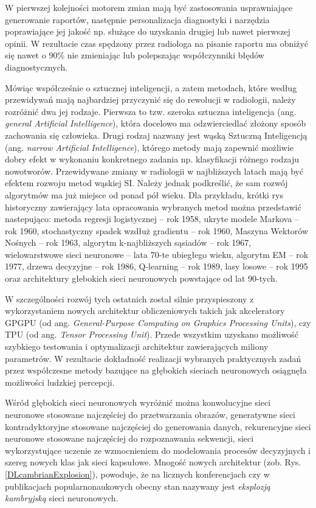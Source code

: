 W pierwszej kolejności motorem zmian mają być zastosowania usprawniające generowanie raportów, następnie personalizacja diagnostyki i narzędzia poprawiające jej jakość np. służące do uzyskania drugiej lub nawet pierwszej opinii. W rezultacie czas spędzony przez radiologa na pisanie raportu ma obniżyć się nawet o 90\% nie zmieniając lub polepszając współczynniki błędów diagnostycznych.

Mówiąc współcześnie o sztucznej inteligencji, a zatem metodach, które według przewidywań mają najbardziej przyczynić się do rewolucji w radiologii, należy rozróżnić dwa jej rodzaje. Pierwsza to tzw. szeroka sztuczna inteligencja (ang. \textit{general Artificial Intelligence}), która docelowo ma odzwierciedlać złożony sposób zachowania się człowieka. Drugi rodzaj nazwany jest wąską Sztuczną Inteligencją (ang. \textit{narrow Artificial Intelligence}), którego metody mają zapewnić możliwie dobry efekt w wykonaniu konkretnego zadania np. klasyfikacji różnego rodzaju nowotworów. Przewidywane zmiany w radiologii w najbliższych latach mają być efektem rozwoju metod wąskiej SI. Należy jednak podkreślić, że sam rozwój algorytmów ma już miejsce od ponad pół wieku. Dla przykładu, krótki rys historyczny zawierający lata opracowania wybranych metod można przedstawić nastepująco: metoda regresji logistycznej -- rok 1958, ukryte modele Markova -- rok 1960, stochastyczny spadek wzdłuż gradientu -- rok 1960, Maszyna Wektorów Nośnych -- rok 1963, algorytm k-najbliższych sąsiadów -- rok 1967, wielowarstwowe sieci neuronowe -- lata 70-te ubiegłego wieku, algorytm EM -- rok 1977, drzewa decyzyjne -- rok 1986, Q-learning -- rok 1989, lasy losowe -- rok 1995 oraz architektury głebokich sieci neuronowych powstające od lat 90-tych. 

W szczególności rozwój tych ostatnich został silnie przyspieszony z wykorzystaniem nowych architektur obliczeniowych takich jak akceleratory GPGPU (od ang. \textit{General-Purpose Computing on Graphics Processing Units}), czy TPU (od ang. \textit{Tensor Processing Unit}). Przede wszystkim uzyskano możliwość szybkiego testowania i optymalizacji architektur zawierających miliony parametrów. W rezultacie dokładność realizacji wybranych praktycznych zadań przez współczesne metody bazujące na głębokich sieciach neuronowych osiągnęła możliwości ludzkiej percepcji. 

Wśród głębokich sieci neuronowych wyróżnić można konwolucyjne sieci neuronowe stosowane najczęściej do przetwarzania obrazów, generatywne sieci kontradyktoryjne stosowane najczęściej do generowania danych, rekurencyjne sieci neuronowe stosowane najczęściej do rozpoznawania sekwencji, sieci wykorzystujące uczenie ze wzmocnieniem do modelowania procesów decyzyjnych i szereg nowych klas jak sieci kapsułowe. Mnogość nowych architektur (zob. Rys. \ref{DLcambrianExplosion}), powoduje, że na licznych konferencjach czy w publikacjach popularnonaukowych obecny stan nazywany jest \textit{eksplozją kambryjską} sieci neuronowych. 

